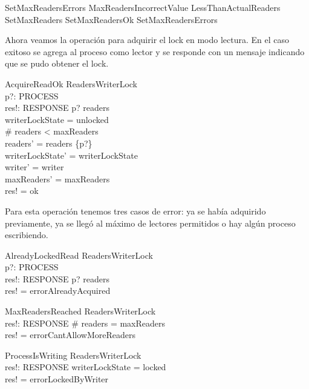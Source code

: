 \documentclass[a4paper, 12pt]{article}
\begin{document}
\begin{zed}
SetMaxReadersErrors  MaxReadersIncorrectValue \lor LessThanActualReaders 
\also
SetMaxReaders  SetMaxReadersOk \lor SetMaxReadersErrors
\end{zed}

Ahora veamos la operación para adquirir el lock en modo lectura. En el caso exitoso se agrega al proceso como lector y se responde con un mensaje indicando que se pudo obtener el lock.

\begin{schema}{AcquireReadOk}
    \Delta ReadersWriterLock \\
    p?: PROCESS \\
    res!: RESPONSE
\where
    p? \notin readers \\
    writerLockState = unlocked \\
    \# readers < maxReaders \\
    readers' = readers \cup \{p?\} \\
    writerLockState' = writerLockState \\
    writer' = writer \\
    maxReaders' = maxReaders \\
    res! = ok
\end{schema}

Para esta operación tenemos tres casos de error: ya se había adquirido previamente, ya se llegó al máximo de lectores permitidos o hay algún proceso escribiendo.

\begin{schema}{AlreadyLockedRead}
    \Xi ReadersWriterLock \\
    p?: PROCESS \\
    res!: RESPONSE
\where
    p? \in readers \\
    res! = errorAlreadyAcquired
\end{schema}

\begin{schema}{MaxReadersReached}
    \Xi ReadersWriterLock \\
    res!: RESPONSE
\where
    \# readers = maxReaders \\
    res! = errorCantAllowMoreReaders
\end{schema}

\begin{schema}{ProcessIsWriting}
    \Xi ReadersWriterLock \\
    res!: RESPONSE
\where
    writerLockState = locked \\
    res! = errorLockedByWriter
\end{schema}
\end{document}
